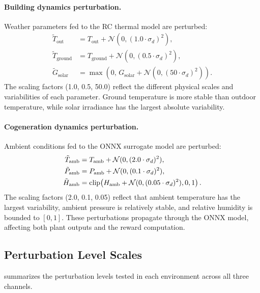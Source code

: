 \paragraph{Building dynamics perturbation.} Weather parameters fed to the RC thermal model are perturbed:
\begin{align}
    \tilde{T}_{\text{out}} &= T_{\text{out}} + \mathcal{N}(0, (1.0 \cdot \sigma_d)^2), \label{eq:bldg_env_tout} \\
    \tilde{T}_{\text{ground}} &= T_{\text{ground}} + \mathcal{N}(0, (0.5 \cdot \sigma_d)^2), \label{eq:bldg_env_tgnd} \\
    \tilde{G}_{\text{solar}} &= \max(0, \, G_{\text{solar}} + \mathcal{N}(0, (50 \cdot \sigma_d)^2)). \label{eq:bldg_env_solar}
\end{align}
The scaling factors (1.0, 0.5, 50.0) reflect the different physical scales and variabilities of each parameter. Ground temperature is more stable than outdoor temperature, while solar irradiance has the largest absolute variability.

\paragraph{Cogeneration dynamics perturbation.} Ambient conditions fed to the ONNX surrogate model are perturbed:
\begin{align}
    \tilde{T}_{\text{amb}} &= T_{\text{amb}} + \mathcal{N}(0, (2.0 \cdot \sigma_d)^2), \label{eq:cogen_env_tamb} \\
    \tilde{P}_{\text{amb}} &= P_{\text{amb}} + \mathcal{N}(0, (0.1 \cdot \sigma_d)^2), \label{eq:cogen_env_pamb} \\
    \tilde{H}_{\text{amb}} &= \operatorname{clip}\!\left(H_{\text{amb}} + \mathcal{N}(0, (0.05 \cdot \sigma_d)^2), 0, 1\right). \label{eq:cogen_env_hamb}
\end{align}
The scaling factors (2.0, 0.1, 0.05) reflect that ambient temperature has the largest variability, ambient pressure is relatively stable, and relative humidity is bounded to $[0, 1]$. These perturbations propagate through the ONNX model, affecting both plant outputs and the reward computation.

\subsection{Perturbation Level Scales}
\label{sec:noise_levels}

 summarizes the perturbation levels tested in each environment across all three channels.

